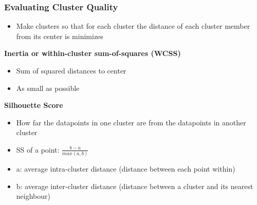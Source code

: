 \subsubsection{Evaluating Cluster Quality}
\begin{itemize}
    \item Make clusters so that for each cluster the distance of each cluster member from its center is minimizes
\end{itemize}
\textbf{Inertia or within-cluster sum-of-squares (WCSS)}
\begin{itemize}
    \item Sum of squared distances to center
    \item As small as possible
\end{itemize}
\textbf{Silhouette Score}
\begin{itemize}
    \item How far the datapoints in one cluster are from the datapoints in another cluster
    \item SS of a point: $\frac{b-a}{max(a,b)}$
    \item a: average intra-cluster distance (distance between each point within)
    \item b: average inter-cluster distance (distance between a cluster and its nearest neighbour)
\end{itemize}
